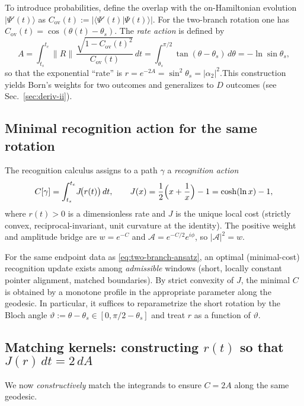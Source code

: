 \documentclass[11pt,letterpaper]{article}
\theoremstyle{definition}
\begin{document}
To introduce probabilities, define the overlap with the on-Hamiltonian evolution \(|\Psi'(t)\rangle\) as \(C_{\mathrm{ov}}(t):=|\langle \Psi'(t)|\Psi(t)\rangle|\). For the two-branch rotation one has \(C_{\mathrm{ov}}(t)=\cos(\theta(t)-\theta_s)\). The \emph{rate action} is defined by
\begin{equation}
A=\int_{t_s}^{t_e}\!\|R\|\,\frac{\sqrt{1-C_{\mathrm{ov}}(t)^2}}{C_{\mathrm{ov}}(t)}\,dt
=\int_{\theta_s}^{\pi/2}\!\tan(\theta-\theta_s)\,d\theta
=-\ln\sin\theta_s,
\label{eq:A-two-branch}
\end{equation}
so that the exponential ``rate'' is \(r=e^{-2A}=\sin^2\theta_s=|\alpha_2|^2\).\;This construction yields Born's weights for two outcomes and generalizes to \(D\) outcomes (see Sec.~\ref{sec:deriv-ii}).

\subsection{Minimal recognition action for the same rotation}

The recognition calculus assigns to a path \(\gamma\) a \emph{recognition action}
\begin{equation}
C[\gamma]=\int_{t_s}^{t_e}\!J\!\bigl(r(t)\bigr)\,dt,
\qquad
J(x)=\frac12\Bigl(x+\frac1x\Bigr)-1=\cosh(\ln x)-1,
\label{eq:C-recogn}
\end{equation}
where \(r(t)>0\) is a dimensionless rate and \(J\) is the unique local cost (strictly convex, reciprocal-invariant, unit curvature at the identity). The positive weight and amplitude bridge are \(w=e^{-C}\) and \(\mathcal A=e^{-C/2}e^{i\phi}\), so \(|\mathcal A|^2=w\).

For the same endpoint data as \eqref{eq:two-branch-ansatz}, an optimal (minimal-cost) recognition update exists among \emph{admissible} windows (short, locally constant pointer alignment, matched boundaries). By strict convexity of \(J\), the minimal \(C\) is obtained by a monotone profile in the appropriate parameter along the geodesic. In particular, it suffices to reparametrize the short rotation by the Bloch angle \(\vartheta:=\theta-\theta_s\in[0,\pi/2-\theta_s]\) and treat \(r\) as a function of \(\vartheta\).

\subsection{Matching kernels: constructing \(r(t)\) so that \(J(r)\,dt=2\,dA\)}

We now \emph{constructively} match the integrands to ensure \(C=2A\) along the same geodesic.
\end{document}
